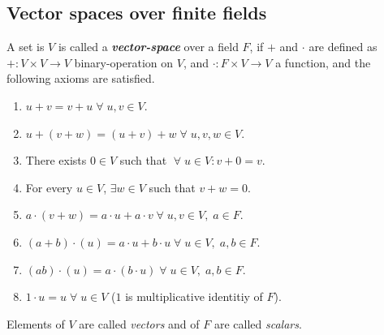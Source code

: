 \documentclass[../main.tex]{subfiles}
\begin{document}
\subsection{Vector spaces over finite fields}
	\begin{defn}
		A set is $V$ is called a \textbf{\emph{vector-space}} over a field $F$, if $+$ and $\cdot$ are defined as $+: V\times V\rightarrow V$ binary-operation on $V$, and $\cdot :F\times V\rightarrow V$ a function, and the following axioms are satisfied.
		\begin{enumerate}[label=(\roman*)]
		\itemsep-1mm
		\item $u+v = v+u \;\forall\; u,v \in V$.
		\item $u+(v+w) = (u+v)+w \;\forall\; u,v,w \in V$.
		\item There exists $0\in V$ such that $\;\forall\; u \in V: v+0=v$.
		\item For every $u\in V$, $\exists w\in V$ such that $v+w=0$.
		\item $a\cdot(v+w) = a\cdot u+a\cdot v \;\forall\; u,v \in V,\; a\in F$.
		\item $(a+b)\cdot(u) = a\cdot u + b\cdot u \;\forall\; u \in V,\; a,b\in F$.
		\item $(ab)\cdot(u) = a\cdot(b\cdot u) \;\forall\; u \in V,\; a,b\in F$.
		\item $1\cdot u = u \;\forall\; u\in V$ ($1$ is multiplicative identitiy of $F$). 	
\end{enumerate}
	Elements of $V$ are called \emph{vectors} and of $F$ are called \emph{scalars}.		 
	\end{defn}
	
\end{document}
